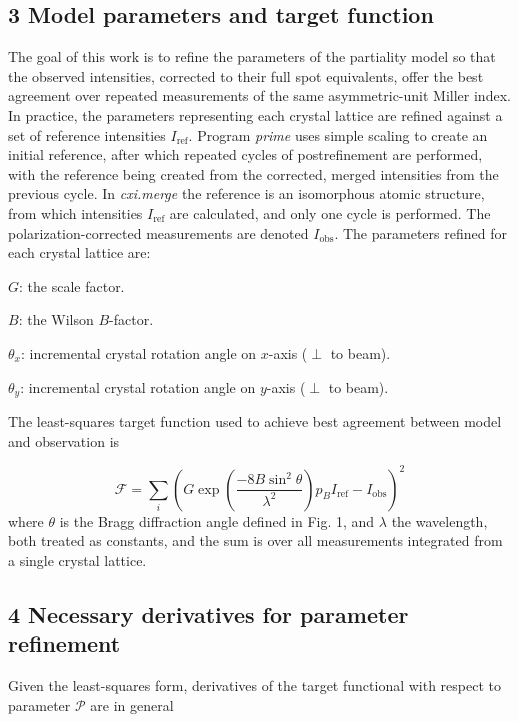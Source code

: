\documentclass[12pt, letterpaper]{article}
\begin{document}
  \subsection*{3 Model parameters and target function}
  \par The goal of this work is to refine the parameters of the partiality model so that the 
  observed intensities, corrected to their full spot equivalents, offer the best agreement over
  repeated measurements of the same asymmetric-unit Miller index.  In practice,
  the parameters representing each crystal lattice are refined 
  against a set of reference intensities $I_{\mathrm{ref}}$.  
  Program {\it prime} uses simple scaling to create an initial reference, after which repeated 
  cycles of postrefinement are performed, with the reference being created from the corrected, 
  merged intensities from the previous cycle.  In {\it cxi.merge} the reference is an isomorphous
  atomic structure, from which intensities $I_{\mathrm{ref}}$ are calculated, and only one 
  cycle is performed.  The polarization-corrected measurements are denoted $I_{\mathrm{obs}}$.
  The parameters refined for each crystal lattice are:
  
  \par $G$: the scale factor.
  \par $B$: the Wilson $B$-factor.
  \par $\theta_{x}$: incremental crystal rotation angle on $x$-axis ($\perp$ to beam).
  \par $\theta_{y}$: incremental crystal rotation angle on $y$-axis ($\perp$ to beam).
  \par The least-squares target function used to achieve best agreement between model and 
  observation is 
  
  
  \begin{equation}
 \mathscr{F} =  \sum_{i} \limits
    ( G  \exp(\dfrac{-8B\sin^2\theta}{\lambda^2}) p_B I_{\mathrm{ref}} - I_{\mathrm{obs}})^{2}
\end{equation}
where $\theta$ is the Bragg diffraction angle defined in Fig. 1, and $\lambda$ the wavelength, both 
treated as constants, and the sum is over all measurements integrated from a single crystal lattice. 

  \subsection*{4 Necessary derivatives for parameter refinement}

  \par Given the least-squares form, derivatives of the target functional with respect to 
  parameter $\mathscr{P}$ are in general
  
\end{document}
